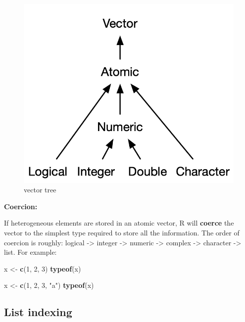 \documentclass[]{book}
\newenvironment{Shaded}{\begin{snugshade}}{\end{snugshade}}
\newcommand{\DecValTok}[1]{\textcolor[rgb]{0.00,0.00,0.81}{#1}}
\newcommand{\KeywordTok}[1]{\textcolor[rgb]{0.13,0.29,0.53}{\textbf{#1}}}
\newcommand{\NormalTok}[1]{#1}
\newcommand{\StringTok}[1]{\textcolor[rgb]{0.31,0.60,0.02}{#1}}
\begin{document}
\begin{figure}
\centering
\includegraphics{R/RDataWrangling/images/summary_tree_atomic.png}
\caption{vector tree}
\end{figure}

\textbf{Coercion:}

If heterogeneous elements are stored in an atomic vector, R will \textbf{coerce} the vector to the simplest type required to store all the information. The order of coercion is roughly: logical -\textgreater{} integer -\textgreater{} numeric -\textgreater{} complex -\textgreater{} character -\textgreater{} list. For example:

\begin{Shaded}
\begin{Highlighting}[]
\NormalTok{x <-}\StringTok{ }\KeywordTok{c}\NormalTok{(}\DecValTok{1}\NormalTok{, }\DecValTok{2}\NormalTok{, }\DecValTok{3}\NormalTok{)}
\KeywordTok{typeof}\NormalTok{(x)}

\NormalTok{x <-}\StringTok{ }\KeywordTok{c}\NormalTok{(}\DecValTok{1}\NormalTok{, }\DecValTok{2}\NormalTok{, }\DecValTok{3}\NormalTok{, }\StringTok{"a"}\NormalTok{)}
\KeywordTok{typeof}\NormalTok{(x)}
\end{Highlighting}
\end{Shaded}

\hypertarget{list-indexing}{%
\subsection{List indexing}\label{list-indexing}}
\end{document}
